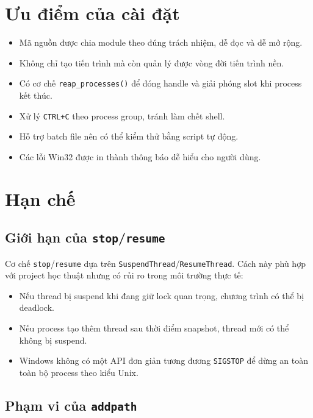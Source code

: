 \documentclass[13pt,a4paper,oneside]{extreport}
\begin{document}
\section{Ưu điểm của cài đặt}

\begin{itemize}[leftmargin=1.2cm]
	\item Mã nguồn được chia module theo đúng trách nhiệm, dễ đọc và dễ mở rộng.
	\item Không chỉ tạo tiến trình mà còn quản lý được vòng đời tiến trình nền.
	\item Có cơ chế \texttt{reap\_processes()} để đóng handle và giải phóng slot khi process kết thúc.
	\item Xử lý \texttt{CTRL+C} theo process group, tránh làm chết shell.
	\item Hỗ trợ batch file nên có thể kiểm thử bằng script tự động.
	\item Các lỗi Win32 được in thành thông báo dễ hiểu cho người dùng.
\end{itemize}

\section{Hạn chế}

\subsection{Giới hạn của \texttt{stop}/\texttt{resume}}

Cơ chế \texttt{stop}/\texttt{resume} dựa trên \texttt{SuspendThread}/\texttt{ResumeThread}. Cách này phù hợp với project học thuật nhưng có rủi ro trong môi trường thực tế:

\begin{itemize}[leftmargin=1.2cm]
	\item Nếu thread bị suspend khi đang giữ lock quan trọng, chương trình có thể bị deadlock.
	\item Nếu process tạo thêm thread sau thời điểm snapshot, thread mới có thể không bị suspend.
	\item Windows không có một API đơn giản tương đương \texttt{SIGSTOP} để dừng an toàn toàn bộ process theo kiểu Unix.
\end{itemize}

\subsection{Phạm vi của \texttt{addpath}}
\end{document}
